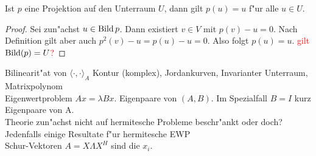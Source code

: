 \begin{prop}
Ist $p$ eine Projektion auf den Unterraum $U$, dann gilt $p(u) = u$ f"ur
alle $u \in U$.
\end{prop}
\begin{proof}
Sei zun"achst $u \in \operatorname{Bild}{p}$. Dann existiert $v \in V$ mit $p(v) - u = 0$.
Nach Definition gilt aber auch $p^2(v)-u = p(u)-u = 0$. Also folgt $p(u)=u$.
\textcolor{red}{gilt $\operatorname{Bild}(p) = U$?}
\end{proof}

Bilinearit"at von $\langle \cdot, \cdot \rangle_A$
Kontur (komplex), Jordankurven, Invarianter Unterraum, Matrixpolynom\\

Eigenwertproblem $Ax = \lambda Bx$. Eigenpaare von $(A,B)$. Im Spezialfall $B=I$ kurz Eigenpaare von A.\\

Theorie zun"achst nicht auf hermitesche Probleme beschr"ankt oder doch? Jedenfalls einige Resultate f"ur hermitesche EWP\\

Schur-Vektoren $A = X\Lambda X^H$ sind die $x_i$.
